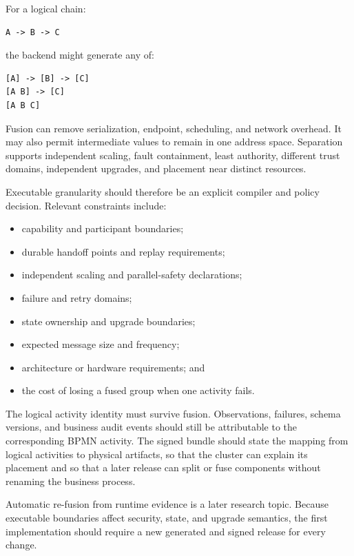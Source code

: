 For a logical chain:

\begin{verbatim}
A -> B -> C
\end{verbatim}

the backend might generate any of:

\begin{verbatim}
[A] -> [B] -> [C]
[A B] -> [C]
[A B C]
\end{verbatim}

Fusion can remove serialization, endpoint, scheduling, and network overhead. It
may also permit intermediate values to remain in one address space. Separation
supports independent scaling, fault containment, least authority, different
trust domains, independent upgrades, and placement near distinct resources.

Executable granularity should therefore be an explicit compiler and policy
decision. Relevant constraints include:

\begin{itemize}
    \item capability and participant boundaries;
    \item durable handoff points and replay requirements;
    \item independent scaling and parallel-safety declarations;
    \item failure and retry domains;
    \item state ownership and upgrade boundaries;
    \item expected message size and frequency;
    \item architecture or hardware requirements; and
    \item the cost of losing a fused group when one activity fails.
\end{itemize}

The logical activity identity must survive fusion. Observations, failures,
schema versions, and business audit events should still be attributable to the
corresponding BPMN activity. The signed bundle should state the mapping from
logical activities to physical artifacts, so that the cluster can explain its
placement and so that a later release can split or fuse components without
renaming the business process.

Automatic re-fusion from runtime evidence is a later research topic. Because
executable boundaries affect security, state, and upgrade semantics, the first
implementation should require a new generated and signed release for every
change.

